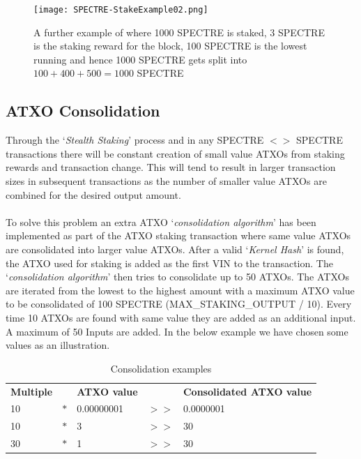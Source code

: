 \begin{figure}[ht]
	\centering
	\texttt{[image: SPECTRE-StakeExample02.png]}
	\caption{A further example of where 1000 SPECTRE is staked, 3 SPECTRE 
	is the staking reward for the block, 100 SPECTRE is the lowest running 
	and hence 1000 SPECTRE gets split into $100 + 400 + 500 = 1000$ SPECTRE}
\end{figure}



\subsection{ATXO Consolidation}
Through the ‘\textit{Stealth Staking}’ process and in any SPECTRE $<>$
SPECTRE transactions there will be constant creation of small value ATXOs
from staking rewards and transaction change. This will tend to result in
larger transaction sizes in subsequent transactions as the number of
smaller value ATXOs are combined for the desired output amount.
\\
\\
\noindent
To solve this problem an extra ATXO ‘\textit{consolidation algorithm}’
has been implemented as part of the ATXO staking transaction where same
value ATXOs are consolidated into larger value ATXOs. After a valid
‘\textit{Kernel Hash}’ is found, the ATXO used for staking is added
as the first VIN to the transaction. The ‘\textit{consolidation algorithm}’
then tries to consolidate up to 50 ATXOs. The ATXOs are iterated from the
lowest to the highest amount with a maximum ATXO value to be consolidated
of 100 SPECTRE (MAX\_STAKING\_OUTPUT / 10). Every time 10 ATXOs are found
with same value they are added as an additional input. A maximum of 50
Inputs are added. In the below example we have chosen some values as an
illustration.



   \begin{table}[h]
	\centering
	\begin{tabular}{lllll}
		\textbf{Multiple} &     & \textbf{ATXO value} &      & \textbf{Consolidated ATXO value} \\
		10                & $*$ & 0.00000001          & $>>$ & 0.0000001 \\
		10                & $*$ & 3                   & $>>$ & 30        \\
		30                & $*$ & 1                   & $>>$ & 30        \\
	\end{tabular}

	\caption{Consolidation examples}
	\label{tbl:consolidationExamples}
\end{table}

